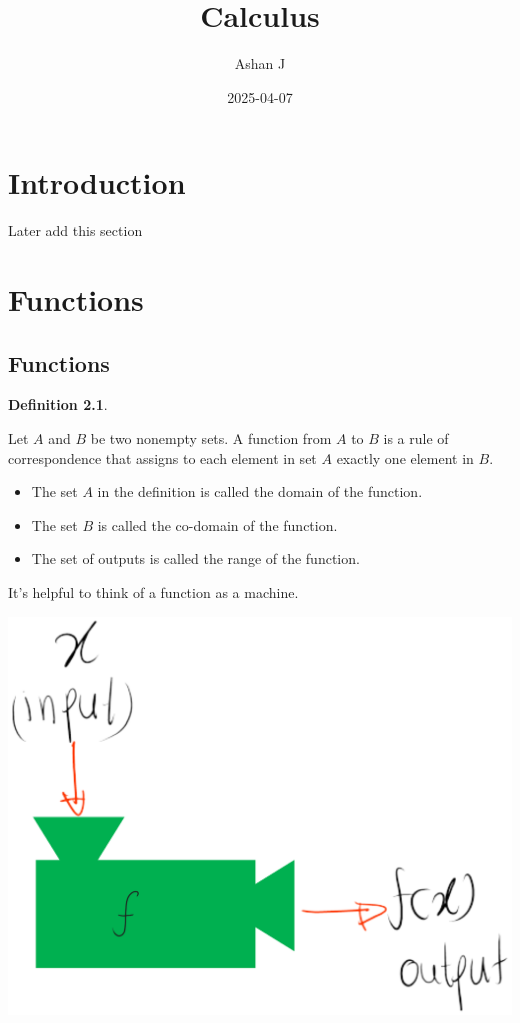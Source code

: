 \documentclass[
]{book}
\title{Calculus}
\author{Ashan J}
\date{2025-04-07}
\providecommand{\tightlist}{%
  \setlength{\itemsep}{0pt}\setlength{\parskip}{0pt}}
\theoremstyle{definition}
\newtheorem{definition}{Definition}[chapter]
\theoremstyle{definition}
\theoremstyle{definition}
\theoremstyle{definition}
\theoremstyle{remark}
\begin{document}
\maketitle

{
\setcounter{tocdepth}{1}
\tableofcontents
}
\chapter{Introduction}\label{introduction}

Later add this section

\chapter{Functions}\label{functions}

\section{Functions}\label{functions-1}

\begin{definition}
\protect\hypertarget{def:unnamed-chunk-1}{}\label{def:unnamed-chunk-1}

Let \(A\) and \(B\) be two nonempty sets. A function from \(A\) to \(B\) is a rule of correspondence that assigns to each element in set \(A\) exactly one element in \(B\).

\begin{itemize}
\tightlist
\item
  The set \(A\) in the definition is called the domain of the function.
\item
  The set \(B\) is called the co-domain of the function.
\item
  The set of outputs is called the range of the function.
\end{itemize}

\end{definition}

It's helpful to think of a function as a machine.

\includegraphics{fig/fig2.png}
\end{document}
